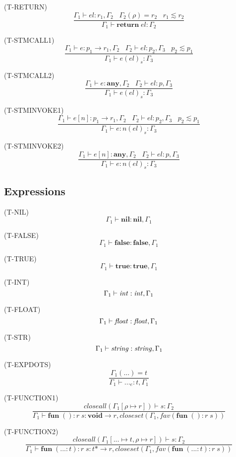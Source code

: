 \documentclass{paper}
\newcommand{\Any}{\mathbf{any}}
\newcommand{\Nil}{\mathbf{nil}}
\newcommand{\False}{\mathbf{false}}
\newcommand{\True}{\mathbf{true}}
\newcommand{\Void}{\mathbf{void}}
\newcommand{\mylabel}[1]{\; (\textsc{#1})}
\newcommand{\env}{\Gamma}
\newcommand{\ret}{\rho}
\begin{document}
\mylabel{T-RETURN}
\[
\dfrac{\env_{1} \vdash el:r_{1}, \env_{2} \;\;\;
       \env_{2}(\ret) = r_{2} \;\;\;
       r_{1} \lesssim r_{2}}
      {\env_{1} \vdash \mathbf{return} \; el:\env_{2}}
\]

\mylabel{T-STMCALL1}
\[
\dfrac{\env_{1} \vdash e:p_{1} \rightarrow r_{1}, \env_{2} \;\;\;
       \env_{2} \vdash el:p_{2}, \env_{3} \;\;\;
       p_{2} \lesssim p_{1}}
      {\env_{1} \vdash e(el)_{s}:\env_{3}}
\]

\mylabel{T-STMCALL2}
\[
\dfrac{\env_{1} \vdash e:\Any, \env_{2} \;\;\;
       \env_{2} \vdash el:p, \env_{3}}
      {\env_{1} \vdash e(el)_{s}:\env_{3}}
\]

\mylabel{T-STMINVOKE1}
\[
\dfrac{\env_{1} \vdash e[n]:p_{1} \rightarrow r_{1}, \env_{2} \;\;\;
       \env_{2} \vdash el:p_{2}, \env_{3} \;\;\;
       p_{2} \lesssim p_{1}}
      {\env_{1} \vdash e{:}n(el)_{s}:\env_{3}}
\]

\mylabel{T-STMINVOKE2}
\[
\dfrac{\env_{1} \vdash e[n]:\Any, \env_{2} \;\;\;
       \env_{2} \vdash el:p, \env_{3}}
      {\env_{1} \vdash e{:}n(el)_{s}:\env_{3}}
\]

\subsection{Expressions}

\noindent

\mylabel{T-NIL}
\[
\env_{1} \vdash \mathbf{nil}:\Nil, \env_{1}
\]

\mylabel{T-FALSE}
\[
\env_{1} \vdash \mathbf{false}:\False, \env_{1}
\]

\mylabel{T-TRUE}
\[
\env_{1} \vdash \mathbf{true}:\True, \env_{1}
\]

\mylabel{T-INT}
\[
\env_{1} \vdash {\it int}:{\it int}, \env_{1}
\]

\mylabel{T-FLOAT}
\[
\env_{1} \vdash {\it float}:{\it float}, \env_{1}
\]

\mylabel{T-STR}
\[
\env_{1} \vdash {\it string}:{\it string}, \env_{1}
\]

\mylabel{T-EXPDOTS}
\[
\dfrac{\env_{1}({...}) = t}
      {\env_{1} \vdash {...}_{e}:t, \env_{1}}
\]

\mylabel{T-FUNCTION1}
\[
\dfrac{closeall(\env_{1}[\ret \mapsto r]) \vdash s:\env_{2}}
      {\env_{1} \vdash \mathbf{fun} \; (){:}r \; s:\Void \rightarrow r, closeset(\env_{1}, fav(\mathbf{fun} \; (){:}r \; s))}
\]

\mylabel{T-FUNCTION2}
\[
\dfrac{closeall(\env_{1}[{...} \mapsto t, \ret \mapsto r]) \vdash s:\env_{2}}
      {\env_{1} \vdash \mathbf{fun} \; ({...}{:}t){:}r \; s:t{*} \rightarrow r, closeset(\env_{1}, fav(\mathbf{fun} \; ({...}{:}t){:}r \; s))}
\]
\end{document}
